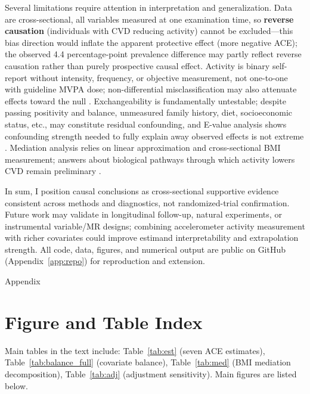 \documentclass[12pt,a4paper]{article}
\begin{document}
Several limitations require attention in interpretation and generalization. Data are cross-sectional, all variables measured at one examination time, so \textbf{reverse causation} (individuals with CVD reducing activity) cannot be excluded---this bias direction would inflate the apparent protective effect (more negative ACE); the observed 4.4 percentage-point prevalence difference may partly reflect reverse causation rather than purely prospective causal effect. Activity is binary self-report without intensity, frequency, or objective measurement, not one-to-one with guideline MVPA dose; non-differential misclassification may also attenuate effects toward the null \cite{mi2025creview}. Exchangeability is fundamentally untestable; despite passing positivity and balance, unmeasured family history, diet, socioeconomic status, etc., may constitute residual confounding, and E-value analysis shows confounding strength needed to fully explain away observed effects is not extreme \cite{vanderweele2017evalue,hernan2024whatif}. Mediation analysis relies on linear approximation and cross-sectional BMI measurement; answers about biological pathways through which activity lowers CVD remain preliminary \cite{vanderweele2015explanation}.

In sum, I position causal conclusions as cross-sectional supportive evidence consistent across methods and diagnostics, not randomized-trial confirmation. Future work may validate in longitudinal follow-up, natural experiments, or instrumental variable/MR designs; combining accelerometer activity measurement with richer covariates could improve estimand interpretability and extrapolation strength. All code, data, figures, and numerical output are public on GitHub (Appendix~\ref{app:repo}) for reproduction and extension.

\clearpage
\centerline{\cfttoctitlefont Appendix}\par
\vspace{1.2em}
\appendix

\section{Figure and Table Index}
\label{app:figures}

Main tables in the text include: Table~\ref{tab:est} (seven ACE estimates), Table~\ref{tab:balance_full} (covariate balance), Table~\ref{tab:med} (BMI mediation decomposition), Table~\ref{tab:adj} (adjustment sensitivity). Main figures are listed below.
\end{document}
